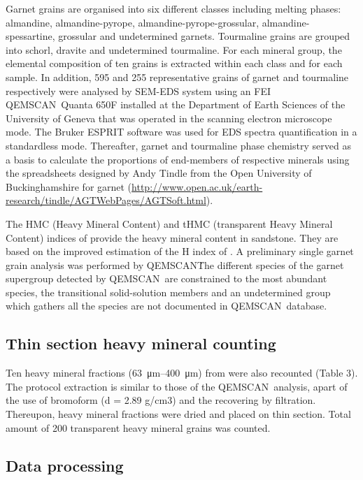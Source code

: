 \documentclass[twoside]{article}
\newcommand\registred{\textsuperscript{\tiny\textregistered}}
\begin{document}
Garnet grains are organised into six different classes including melting phases: almandine, almandine-pyrope, almandine-pyrope-grossular, almandine-spessartine, grossular and undetermined garnets. Tourmaline grains are grouped into schorl, dravite and undetermined tourmaline. For each mineral group, the elemental composition of ten grains is extracted within each class and for each sample.
In addition, 595 and 255 representative grains of garnet and tourmaline respectively were analysed by SEM-EDS system using an FEI QEMSCAN\registred\ Quanta 650F installed at the Department of Earth Sciences of the University of Geneva that was operated in the scanning electron microscope mode. The Bruker ESPRIT software was used for EDS spectra quantification in a standardless mode. Thereafter, garnet and tourmaline phase chemistry served as a basis to calculate the proportions of end-members of respective minerals using the spreadsheets designed by Andy Tindle from the Open University of Buckinghamshire for garnet (\url{http://www.open.ac.uk/earth-research/tindle/AGTWebPages/AGTSoft.html}).\par
\medskip
The HMC (Heavy Mineral Content) and tHMC (transparent Heavy Mineral Content) indices of \cite{Garzanti2007a} provide the heavy mineral content in sandstone. They are based on the improved estimation of the H index of \cite{Baker1962}. A preliminary single garnet grain analysis was performed by QEMSCAN\registred\. The different species of the garnet supergroup \cite{Grew2013} detected by QEMSCAN\registred\ are constrained to the most abundant species, the transitional solid-solution members and an undetermined group which gathers all the species are not documented in QEMSCAN\registred\ database.

\subsection{Thin section heavy mineral counting}

Ten heavy mineral fractions (\SIrange{63}{400}{\micro\meter}) from \cite{Ragusa2009} were also recounted (Table 3). The protocol extraction is similar to those of the QEMSCAN\registred\ analysis, apart of the use of bromoform (d = 2.89 g/cm3) and the recovering by filtration. Thereupon, heavy mineral fractions were dried and placed on thin section. Total amount of 200 transparent heavy mineral grains was counted.

\subsection{Data processing}
\end{document}
